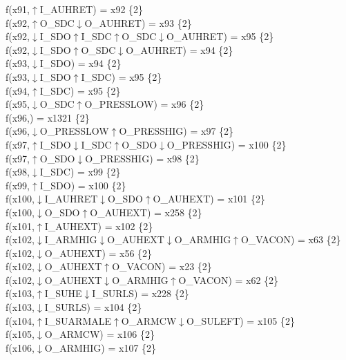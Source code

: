 f(x91,$\uparrow$I\_AUHRET) = x92 \{2\} \\  
f(x92,$\uparrow$O\_SDC$\downarrow$O\_AUHRET) = x93 \{2\} \\  
f(x92,$\downarrow$I\_SDO$\uparrow$I\_SDC$\uparrow$O\_SDC$\downarrow$O\_AUHRET) = x95 \{2\} \\  
f(x92,$\downarrow$I\_SDO$\uparrow$O\_SDC$\downarrow$O\_AUHRET) = x94 \{2\} \\  
f(x93,$\downarrow$I\_SDO) = x94 \{2\} \\  
f(x93,$\downarrow$I\_SDO$\uparrow$I\_SDC) = x95 \{2\} \\  
f(x94,$\uparrow$I\_SDC) = x95 \{2\} \\  
f(x95,$\downarrow$O\_SDC$\uparrow$O\_PRESSLOW) = x96 \{2\} \\  
f(x96,) = x1321 \{2\} \\  
f(x96,$\downarrow$O\_PRESSLOW$\uparrow$O\_PRESSHIG) = x97 \{2\} \\  
f(x97,$\uparrow$I\_SDO$\downarrow$I\_SDC$\uparrow$O\_SDO$\downarrow$O\_PRESSHIG) = x100 \{2\} \\  
f(x97,$\uparrow$O\_SDO$\downarrow$O\_PRESSHIG) = x98 \{2\} \\  
f(x98,$\downarrow$I\_SDC) = x99 \{2\} \\  
f(x99,$\uparrow$I\_SDO) = x100 \{2\} \\  
f(x100,$\downarrow$I\_AUHRET$\downarrow$O\_SDO$\uparrow$O\_AUHEXT) = x101 \{2\} \\  
f(x100,$\downarrow$O\_SDO$\uparrow$O\_AUHEXT) = x258 \{2\} \\  
f(x101,$\uparrow$I\_AUHEXT) = x102 \{2\} \\  
f(x102,$\downarrow$I\_ARMHIG$\downarrow$O\_AUHEXT$\downarrow$O\_ARMHIG$\uparrow$O\_VACON) = x63 \{2\} \\  
f(x102,$\downarrow$O\_AUHEXT) = x56 \{2\} \\  
f(x102,$\downarrow$O\_AUHEXT$\uparrow$O\_VACON) = x23 \{2\} \\  
f(x102,$\downarrow$O\_AUHEXT$\downarrow$O\_ARMHIG$\uparrow$O\_VACON) = x62 \{2\} \\  
f(x103,$\uparrow$I\_SUHE$\downarrow$I\_SURLS) = x228 \{2\} \\  
f(x103,$\downarrow$I\_SURLS) = x104 \{2\} \\  
f(x104,$\uparrow$I\_SUARMALE$\uparrow$O\_ARMCW$\downarrow$O\_SULEFT) = x105 \{2\} \\  
f(x105,$\downarrow$O\_ARMCW) = x106 \{2\} \\  
f(x106,$\downarrow$O\_ARMHIG) = x107 \{2\} \\  
